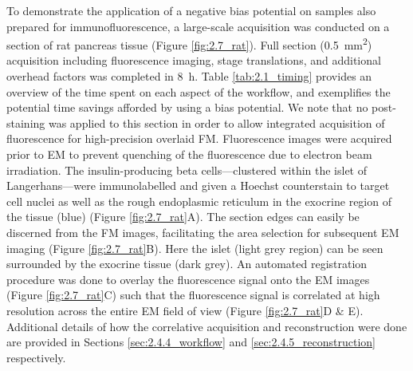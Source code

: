 To demonstrate the application of a negative bias potential on samples also prepared for immunofluorescence, a large-scale acquisition was conducted on a section of rat pancreas tissue (Figure \ref{fig:2.7_rat}). Full section (\SI{0.5}{\milli\meter^2}) acquisition including fluorescence imaging, stage translations, and additional overhead factors was completed in \SI{8}{\hour}. Table \ref{tab:2.1_timing} provides an overview of the time spent on each aspect of the workflow, and exemplifies the potential time savings afforded by using a bias potential. We note that no post-staining was applied to this section in order to allow integrated acquisition of fluorescence for high-precision overlaid FM. Fluorescence images were acquired prior to EM to prevent quenching of the fluorescence due to electron beam irradiation. The insulin-producing beta cells---clustered within the islet of Langerhans---were immunolabelled and given a Hoechst counterstain to target cell nuclei as well as the rough endoplasmic reticulum in the exocrine region of the tissue (blue) (Figure \ref{fig:2.7_rat}A). The section edges can easily be discerned from the FM images, facilitating the area selection for subsequent EM imaging (Figure \ref{fig:2.7_rat}B). Here the islet (light grey region) can be seen surrounded by the exocrine tissue (dark grey). An automated registration procedure \cite{haring2017automated} was done to overlay the fluorescence signal onto the EM images (Figure \ref{fig:2.7_rat}C) such that the fluorescence signal is correlated at high resolution across the entire EM field of view (Figure \ref{fig:2.7_rat}D \& E). Additional details of how the correlative acquisition and reconstruction were done are provided in Sections \ref{sec:2.4.4_workflow} and \ref{sec:2.4.5_reconstruction} respectively.

